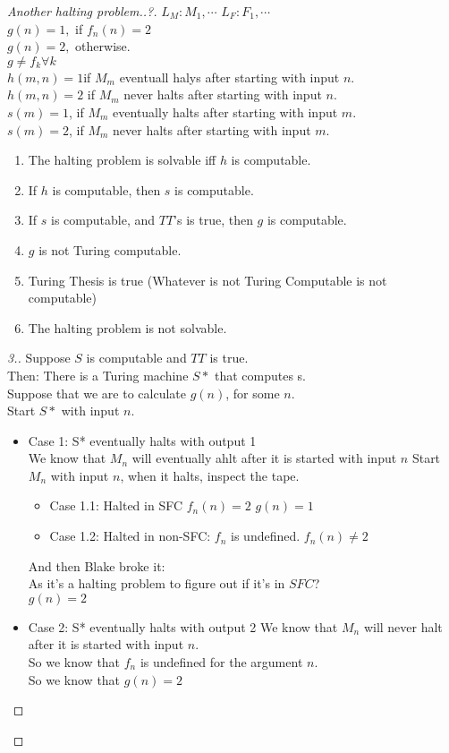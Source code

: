 
\begin{proof}[Another halting problem..?]
$L_M: M_1, \cdots$
$L_F: F_1, \cdots$ \\
$g(n) = 1,$ if $f_n(n) = 2$ \\
$g(n) = 2,$ otherwise. \\
$g \not = f_k \forall k$ \\
$h(m,n)= 1 $if $M_m$ eventuall halys after starting with input $n$. \\
$h(m,n)= 2$ if $M_m$ never halts after starting with input $n$. \\
$s(m) = 1$, if $M_m$ eventually halts after starting with input $m$. \\
$s(m) = 2$, if $M_m$ never halts after starting with input $m$. \\
\begin{enumerate}
\item The halting problem is solvable iff $h$ is computable.
\item If $h$ is computable, then $s$ is computable.
\item If $s$ is computable, and $TT$'s is true, then $g$ is computable.
\item $g$ is not Turing computable.
\item Turing Thesis is true (Whatever is not Turing Computable is not computable)
\item The halting problem is not solvable.
\end{enumerate}
\begin{proof}[3.]
Suppose $S$ is computable and $TT$ is true. \\
Then: There is a Turing machine $S*$ that computes s.\\
Suppose that we are to calculate $g(n)$, for some $n$. \\
Start $S*$ with input $n$. \\
\begin{itemize}
\item Case 1: S* eventually halts with output 1\\
We know that $M_n$ will eventually ahlt after it is started with input $n$
Start $M_n$ with input $n$, when it halts, inspect the tape.
\begin{itemize}
\item Case 1.1: Halted in SFC
$f_n(n) = 2$ 
$g(n) = 1$
\item Case 1.2: Halted in non-SFC: $f_n$ is undefined.
$f_n(n) \not=2$
\end{itemize}
\large {
And then Blake broke it: \\
As it's a halting problem to figure out if it's in $SFC$?\\ }
\normalsize
$g(n)=2$
\item Case 2: S* eventually halts with output 2
We know that $M_n$ will never halt after it is started with input $n$. \\
So we know that $f_n$ is undefined for the argument $n$. \\
So we know that $g(n) = 2$ \\
\end{itemize}


\end{proof}
\end{proof}

